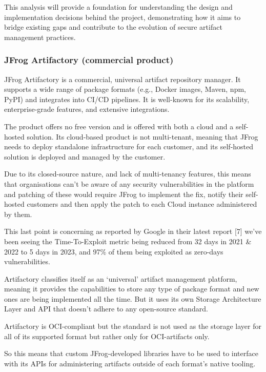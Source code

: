 \documentclass{article}
\begin{document}
  This analysis will provide a foundation for understanding the design and implementation decisions behind the project, demonstrating how it aims to bridge existing gaps and contribute to the evolution of secure artifact management practices.

  \subsubsection{JFrog Artifactory (commercial product)}

  JFrog Artifactory is a commercial, universal artifact repository manager. It supports a wide range of package formats (e.g., Docker images, Maven, npm, PyPI) and integrates into CI/CD pipelines. It is well-known for its scalability, enterprise-grade features, and extensive integrations.

  The product offers no free version and is offered with both a cloud and a self-hosted solution. Its cloud-based product is not multi-tenant, meaning that JFrog needs to deploy standalone infrastructure for each customer, and its self-hosted solution is deployed and managed by the customer.
  
  Due to its closed-source nature, and lack of multi-tenancy features, this means that organisations can't be aware of any security vulnerabilities in the platform and patching of these would require JFrog to implement the fix, notify their self-hosted customers and then apply the patch to each Cloud instance administered by them.

  This last point is concerning as reported by Google in their latest report [7] we've been seeing the Time-To-Exploit metric being reduced from 32 days in 2021 \& 2022 to 5 days in 2023, and 97\% of them being exploited as zero-days vulnerabilities.

  Artifactory classifies itself as an `universal' artifact management platform, meaning it provides the capabilities to store any type of package format and new ones are being implemented all the time. But it uses its own Storage Architecture Layer and API that doesn't adhere to any open-source standard.

  Artifactory is OCI-compliant but the standard is not used as the storage layer for all of its supported format but rather only for OCI-artifacts only. 

  So this means that custom JFrog-developed libraries have to be used to interface with its APIs for administering artifacts outside of each format's native tooling.
\end{document}

